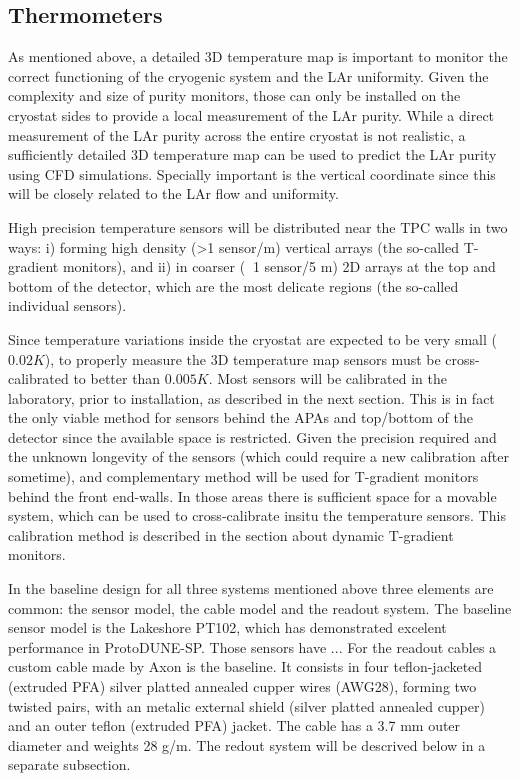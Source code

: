 \subsection{Thermometers}
\label{sec:fdsp-slow-cryo-therm}

As mentioned above, a detailed 3D temperature map is important to monitor the correct functioning of the cryogenic system and the LAr uniformity.
Given the complexity and size of purity monitors, those can only be installed on the cryostat sides to provide a local measurement of
the LAr purity. While a direct measurement of the LAr purity across the entire cryostat is not realistic, a sufficiently detailed 3D temperature map
can be used to predict the LAr purity using CFD simulations. Specially important is the vertical coordinate since this will be closely related to
the LAr flow and uniformity. 

High precision temperature sensors will be distributed near the TPC walls in two ways:
i) forming high density (>1 sensor/m) vertical arrays (the so-called T-gradient monitors), and ii) in coarser ($~$ 1 sensor/5 m) 2D arrays 
at the top and bottom of the detector, which are the most delicate regions (the so-called individual sensors).   

Since temperature variations inside the cryostat are expected to be very small ($0.02 K$), to properly measure the 3D temperature map 
sensors must be cross-calibrated to better than $0.005 K$. Most sensors will be calibrated in the laboratory, prior to installation,
as described in the next section. This is in fact the only viable method for sensors behind the APAs and top/bottom of the detector since the available space is restricted.  
Given the precision required and the unknown longevity of the sensors (which could require a new calibration after sometime), and complementary method
will be used for T-gradient monitors behind the front end-walls. In those areas there is sufficient space for a movable system, which can be used to cross-calibrate insitu
the temperature sensors. This calibration method is described in the section about dynamic T-gradient monitors. 

In the baseline design for all three systems mentioned above three elements are common: the sensor model, the cable model and the readout system.
The baseline sensor model is the Lakeshore PT102, which has demonstrated excelent performance in ProtoDUNE-SP. Those sensors have  ...
For the readout cables a custom cable made by Axon is the baseline. It consists in four teflon-jacketed (extruded PFA)
silver platted annealed cupper wires (AWG28), forming two twisted pairs, with an metalic external shield
(silver platted annealed cupper) and an outer teflon (extruded PFA) jacket. The cable has a 3.7 mm outer diameter and weights 28 g/m.
The redout system will be descrived below in a separate subsection. 

